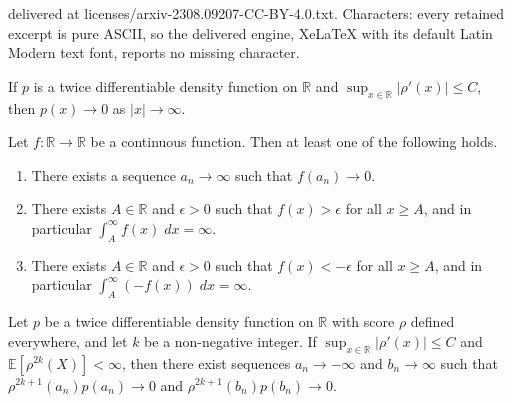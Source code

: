 \documentclass[10pt,a4paper]{amsart}
\newcommand{\E}{\mathbb{E}}
\newcommand{\R}{\mathbb{R}}
\begin{document}
delivered at licenses/arxiv-2308.09207-CC-BY-4.0.txt. Characters: every retained excerpt is pure ASCII, so the delivered engine, XeLaTeX with its default Latin Modern text font, reports no missing character.
	\begin{lemma}
		\label{lem:pconvergent}
		If $p$ is a twice differentiable density function on $\R$ and $\sup_{x\in\R} |\rho'(x)| \leq C$, then $p(x) \to 0$ as $|x|\to\infty$.
	\end{lemma}

	\begin{lemma}
		\label{lem:boundaryconvergent}
		Let $f:\R\to\R$ be a continuous function. Then at least one of the following holds.
		\begin{enumerate}[label=(\alph*)]
			\item There exists a sequence $a_n \to \infty$ such that $f(a_n) \to 0$.
			\item There exists $A\in\R$ and $\epsilon > 0$ such that $f(x) >\epsilon$ for all $x\geq A$, and in particular $\int_A^\infty f(x)\;dx = \infty$.
			\item There exists $A\in\R$ and $\epsilon > 0$ such that $f(x) <-\epsilon $ for all $x\geq A$, and in particular $\int_A^\infty (-f(x))\;dx = \infty$.
		\end{enumerate}
	\end{lemma}

	\begin{lemma}
		\label{lem:scoreboundaryconvergent}
		Let $p$ be a twice differentiable density function on $\R$ with score $\rho$ defined everywhere, and let $k$ be a non-negative integer. If $\sup_{x\in\R} |\rho'(x)| \leq C$ and $\E[\rho^{2k}(X)]<\infty$, then there exist sequences $a_n \to -\infty$ and $b_n \to \infty$ such that $\rho^{2k+1}(a_n)p(a_n) \to 0$ and $\rho^{2k+1}(b_n)p(b_n) \to 0$.%
	\end{lemma}
\end{document}
